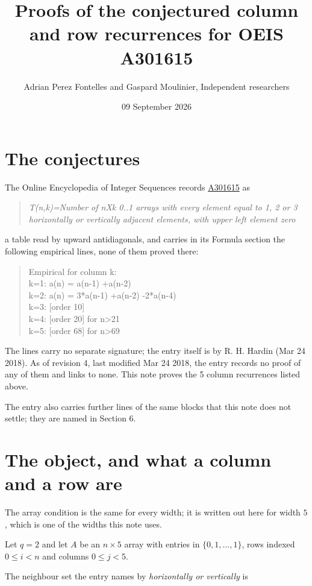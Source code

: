 \documentclass[11pt]{article}
\title{Proofs of the conjectured column and row recurrences for OEIS A301615}
\author{Adrian Perez Fontelles and Gaspard Moulinier, Independent researchers}
\date{09 September 2026}
\theoremstyle{definition}
\begin{document}
\maketitle
\section{The conjectures}

The Online Encyclopedia of Integer Sequences records \href{https://oeis.org/A301615}{A301615} as

\begin{quote}\itshape T(n,k)=Number of nXk 0..1 arrays with every element equal to 1, 2 or 3 horizontally or vertically adjacent elements, with upper left element zero\end{quote}

a table read by upward antidiagonals, and carries in its Formula section the following empirical lines, none of them proved there:

\begin{quote}\ttfamily Empirical for column k:\\
k=1: a(n) = a(n-1) +a(n-2)\\k=2: a(n) = 3*a(n-1) +a(n-2) -2*a(n-4)\\k=3: [order 10]\\k=4: [order 20] for n>21\\k=5: [order 68] for n>69\end{quote}

The lines carry no separate signature; the entry itself is by R. H. Hardin (Mar 24 2018). As of revision 4, last modified Mar 24 2018, the entry records no proof of any of them and links to none. This note proves the 5 column recurrences listed above.

The entry also carries further lines of the same blocks that this note does not settle; they are named in Section 6.

\section{The object, and what a column and a row are}

The array condition is the same for every width; it is written out here for width $5$, which is one of the widths this note uses.

Let $q = 2$ and let $A$ be an $n \times 5$ array with entries in $\{0,1,\dots,1\}$, rows indexed $0 \le i < n$ and columns $0 \le j < 5$.

The neighbour set the entry names by {\itshape horizontally or vertically} is
\end{document}

